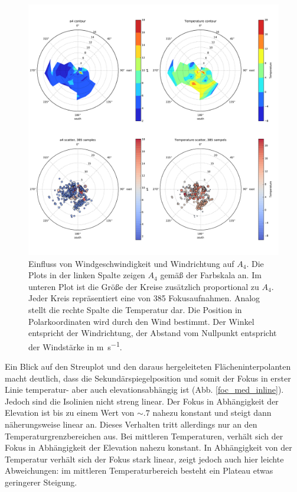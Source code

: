 \begin{figure}[H]
	\centering
	\includegraphics[scale=.46]{wind/wind_a4}
	\caption[Einfluss von Windgeschwindigkeit und Windrichtung auf $A_4$]{Einfluss von Windgeschwindigkeit und Windrichtung auf $A_4$. Die Plots in der linken Spalte zeigen $A_4$ gemäß der Farbskala an. Im unteren Plot ist die Größe der Kreise zusätzlich proportional zu $A_4$. Jeder Kreis repräsentiert eine von 385 Fokusaufnahmen. Analog stellt die rechte Spalte die Temperatur dar. Die Position in Polarkoordinaten wird durch den Wind bestimmt. Der Winkel entspricht der Windrichtung, der Abstand vom Nullpunkt entspricht der Windstärke in \si{\metre\per\second}.}
    \label{wind_a4_inline}
\end{figure}
\pagebreak

Ein Blick auf den Streuplot und den daraus hergeleiteten Flächeninterpolanten macht deutlich, dass die Sekundärspiegelposition und somit der Fokus in erster Linie temperatur- aber auch elevationsabhängig ist (Abb. \ref{foc_med_inline}). Jedoch sind die Isolinien nicht streng linear. Der Fokus in Abhängigkeit der Elevation ist bis zu einem Wert von $\sim\num{.7}$ nahezu konstant und steigt dann näherungsweise linear an. Dieses Verhalten tritt allerdings nur an den Temperaturgrenzbereichen aus. Bei mittleren Temperaturen, verhält sich der Fokus in Abhängigkeit der Elevation nahezu konstant. In Abhängigkeit von der Temperatur verhält sich der Fokus stark linear, zeigt jedoch auch hier leichte Abweichungen: im mittleren Temperaturbereich besteht ein Plateau etwas geringerer Steigung.\\

